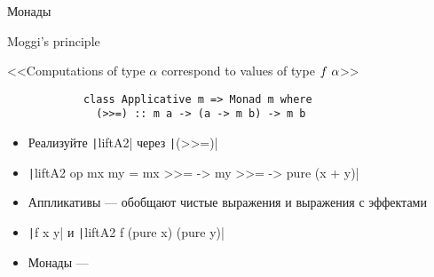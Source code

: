     \begin{frame}[fragile]{Монады}
        \begin{block}{Moggi's principle}
            \begin{center}
                <<Computations of type $\alpha$ correspond to values of type $f~\alpha$>>
            \end{center}
        \end{block}
        \begin{verbatim}
            class Applicative m => Monad m where
              (>>=) :: m a -> (a -> m b) -> m b
        \end{verbatim}
        \begin{itemize}
            \item[\todo] Реализуйте \texttt|liftA2| через \texttt|(>>=)|
            \item[\answer] \pause \texttt|liftA2 op mx my = mx >>= \x -> my >>= \y -> pure (x + y)|
            \item Аппликативы --- обобщают чистые выражения и выражения с эффектами
            \item[\eg] \texttt|f x y| и \texttt|liftA2 f (pure x) (pure y)|
            \item Монады ---
        \end{itemize}
    \end{frame}


